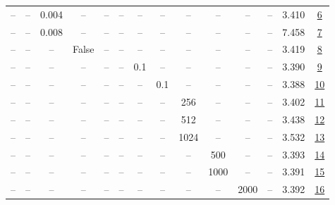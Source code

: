 \begin{table}[H]
\begin{tabular}{cccccccccccccc}
-- & -- & 0.004 & -- & -- & -- & -- & -- & -- & -- & -- & -- & 3.410 & \href{https://wandb.ai/stanford-mercury/optimizer-scaling/runs/sweep-130m-5B-krone91591lr0.004-wd0.5-b10.95-plr0.2-pis1-gn1-nor-46e2ae}{6} \\
-- & -- & 0.008 & -- & -- & -- & -- & -- & -- & -- & -- & -- & 7.458 & \href{https://wandb.ai/stanford-mercury/optimizer-scaling/runs/sweep-130m-5B-kron4e53f2lr0.008-wd0.5-b10.95-plr0.2-pis1-gn1-nor-6c3cc4}{7} \\
-- & -- & -- & False & -- & -- & -- & -- & -- & -- & -- & -- & 3.419 & \href{https://wandb.ai/stanford-mercury/optimizer-scaling/runs/sweep-130m-5B-krone5b648lr0.002-wd0.5-b10.95-plr0.2-pis1-gn1-nor-3d80f2}{8} \\
-- & -- & -- & -- & -- & -- & 0.1 & -- & -- & -- & -- & -- & 3.390 & \href{https://wandb.ai/stanford-mercury/optimizer-scaling/runs/sweep-130m-5B-kronb4e3a9lr0.002-wd0.5-b10.95-plr0.1-pis1-gn1-nor-b5c63e}{9} \\
-- & -- & -- & -- & -- & -- & -- & 0.1 & -- & -- & -- & -- & 3.388 & \href{https://wandb.ai/stanford-mercury/optimizer-scaling/runs/sweep-130m-5B-kron856f4elr0.002-wd0.5-b10.95-plr0.2-pis1-gn1-nor-9bbacc}{10} \\
-- & -- & -- & -- & -- & -- & -- & -- & 256 & -- & -- & -- & 3.402 & \href{https://wandb.ai/stanford-mercury/optimizer-scaling/runs/sweep-130m-5B-kronf8119alr0.002-wd0.5-b10.95-plr0.2-pis1-gn1-nor-73cf68}{11} \\
-- & -- & -- & -- & -- & -- & -- & -- & 512 & -- & -- & -- & 3.438 & \href{https://wandb.ai/stanford-mercury/optimizer-scaling/runs/sweep-130m-5B-kron80879elr0.002-wd0.5-b10.95-plr0.2-pis1-gn1-nor-57a36a}{12} \\
-- & -- & -- & -- & -- & -- & -- & -- & 1024 & -- & -- & -- & 3.532 & \href{https://wandb.ai/stanford-mercury/optimizer-scaling/runs/sweep-130m-5B-kron897453lr0.002-wd0.5-b10.95-plr0.2-pis1-gn1-nor-92b5b8}{13} \\
-- & -- & -- & -- & -- & -- & -- & -- & -- & 500 & -- & -- & 3.393 & \href{https://wandb.ai/stanford-mercury/optimizer-scaling/runs/sweep-130m-5B-kron5226b3lr0.002-wd0.5-b10.95-plr0.2-pis1-gn1-nor-49e5be}{14} \\
-- & -- & -- & -- & -- & -- & -- & -- & -- & 1000 & -- & -- & 3.391 & \href{https://wandb.ai/stanford-mercury/optimizer-scaling/runs/sweep-130m-5B-kron0c9405lr0.002-wd0.5-b10.95-plr0.2-pis1-gn1-nor-d2903e}{15} \\
-- & -- & -- & -- & -- & -- & -- & -- & -- & -- & 2000 & -- & 3.392 & \href{https://wandb.ai/stanford-mercury/optimizer-scaling/runs/sweep-130m-5B-kron3d8947lr0.002-wd0.5-b10.95-plr0.2-pis1-gn1-nor-b13176}{16} \\

\end{tabular}
\end{table}
